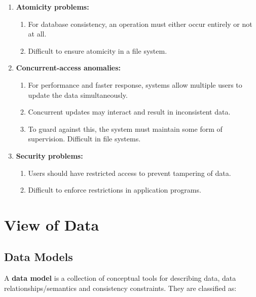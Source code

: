 \documentclass[journal,12pt,twocolumn]{IEEEtran}
\begin{document}
\begin{enumerate}
    \item \textbf{Atomicity problems:}
    \begin{enumerate}
        \item For database consistency, an operation must either occur entirely
        or not at all.
        \item Difficult to ensure atomicity in a file system.
    \end{enumerate}

    \item \textbf{Concurrent-access anomalies:}
    \begin{enumerate}
        \item For performance and faster response, systems allow multiple users
        to update the data simultaneously.
        \item Concurrent updates may interact and result in inconsistent data.
        \item To guard against this, the system must maintain some form of 
        supervision. Difficult in file systems.
    \end{enumerate}

    \item \textbf{Security problems:}
    \begin{enumerate}
        \item Users should have restricted access to prevent tampering of data.
        \item Difficult to enforce restrictions in application programs.
    \end{enumerate}
\end{enumerate}

\section{View of Data}

\subsection{Data Models}

A \textbf{data model} is a collection of conceptual tools for describing data, 
data relationships/semantics and consistency constraints. They are classified as:
\end{document}
